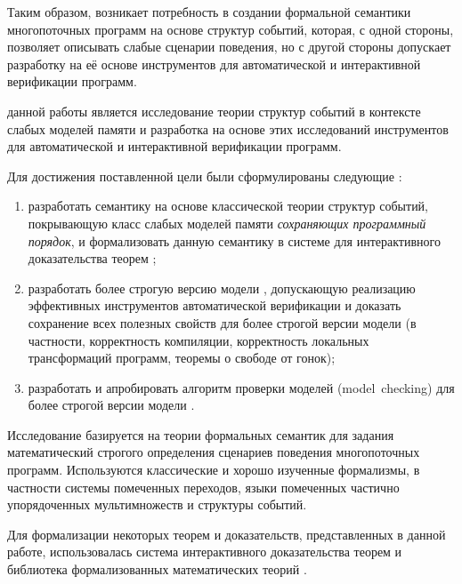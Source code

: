 Таким образом, возникает потребность в создании формальной семантики 
многопоточных программ на основе структур событий, 
которая, с одной стороны, позволяет описывать слабые сценарии поведения, 
но с другой стороны допускает разработку на её основе 
инструментов для автоматической и интерактивной верификации программ. 



{\aim} данной работы является исследование 
теории структур событий в контексте слабых моделей памяти
и разработка на основе этих исследований 
инструментов для автоматической и интерактивной верификации программ. 

Для достижения поставленной цели были сформулированы следующие {\tasks}:
\begin{enumerate}[beginpenalty=10000] %
  \item разработать семантику на основе классической теории структур событий, 
    покрывающую класс слабых моделей памяти \emph{сохраняющих программный порядок},
    и формализовать данную семантику в системе для интерактивного доказательства теорем \coq;
  \item разработать более строгую версию модели \WkmS, допускающую реализацию 
    эффективных инструментов автоматической верификации
    и доказать сохранение всех полезных свойств \Wkm для более строгой версии модели 
    (в частности, корректность компиляции, корректность локальных трансформаций программ, 
     теоремы о свободе от гонок);
  \item разработать и апробировать алгоритм проверки моделей (model~checking) для 
    более строгой версии модели \WkmS.
\end{enumerate}

{\methods}

Исследование базируется на теории формальных семантик для 
задания математический строгого определения сценариев поведения многопоточных программ. 
Используются классические и хорошо изученные формализмы, в частности 
системы помеченных переходов, языки помеченных частично упорядоченных мультимножеств и структуры событий. 

Для формализации некоторых теорем и доказательств, представленных в данной работе, 
использовалась система интерактивного доказательства теорем \coq 
и библиотека формализованных математических теорий \mathcomp.


